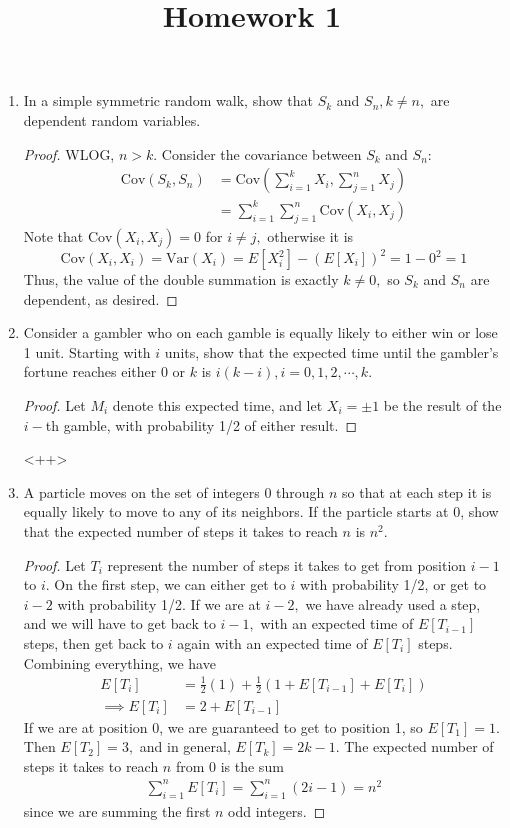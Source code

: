 \documentclass{article}
\newcommand{\var}{\mathrm{Var}}
\newcommand{\cov}{\mathrm{Cov}}
\begin{document}
\title{Homework 1}
\maketitle
\thispagestyle{fancy}

\begin{enumerate}
	\item In a simple symmetric random walk, show that $S_k$ and $S_n, k\neq n,$ are dependent random variables.
		\begin{proof}
			WLOG, $n>k.$ Consider the covariance between $S_k$ and $S_n:$
			\begin{align*}
				\cov(S_k, S_n) &= \cov\left( \sum_{i=1}^{k}X_i, \sum_{j=1}^{n} X_j \right) \\
				&= \sum_{i=1}^{k} \sum_{j=1}^{n} \cov(X_i, X_j)
			\end{align*}
			Note that $\cov(X_i, X_j)=0$ for $i\neq j,$ otherwise it is
			\[\cov(X_i, X_i)=\var(X_i)=E[X_i^2]-(E[X_i])^2 = 1 - 0^2 = 1\]
			Thus, the value of the double summation is exactly $k\neq 0,$ so $S_k$ and $S_n$ are dependent, as desired.
		\end{proof}

	\item Consider a gambler who on each gamble is equally likely to either win or lose 1 unit. Starting with $i$ units, show that the expected time until the gambler's fortune reaches either $0$ or $k$ is $i(k-i), i=0, 1, 2, \cdots, k.$
		\begin{proof}
			Let $M_i$ denote this expected time, and let $X_i=\pm 1$ be the result of the $i-$th gamble, with probability 1/2 of either result. 
		\end{proof}<++>

	\item A particle moves on the set of integers 0 through $n$ so that at each step it is equally likely to move to any of its neighbors. If the particle starts at 0, show that the expected number of steps it takes to reach $n$ is $n^2.$
		\begin{proof}
			Let $T_i$ represent the number of steps it takes to get from position $i-1$ to $i.$ On the first step, we can either get to $i$ with probability 1/2, or get to $i-2$ with probability 1/2. If we are at $i-2,$ we have already used a step, and we will have to get back to $i-1,$ with an expected time of $E[T_{i-1}]$ steps, then get back to $i$ again with an expected time of $E[T_i]$ steps. Combining everything, we have
			\begin{align*}
				E[T_i] &= \frac{1}{2}(1) + \frac{1}{2}\left( 1+E[T_{i-1}] + E[T_i] \right) \\
				\implies E[T_i] &= 2 + E[T_{i-1}]
			\end{align*}
			If we are at position 0, we are guaranteed to get to position 1, so $E[T_1]=1.$ Then $E[T_2]=3,$ and in general, $E[T_k] = 2k-1.$ The expected number of steps it takes to reach $n$ from 0 is the sum
			\begin{align*}
				\sum_{i=1}^{n}E[T_i] = \sum_{i=1}^{n} (2i-1) = n^2
			\end{align*}
			since we are summing the first $n$ odd integers.
		\end{proof}


\end{enumerate}
\end{document}
